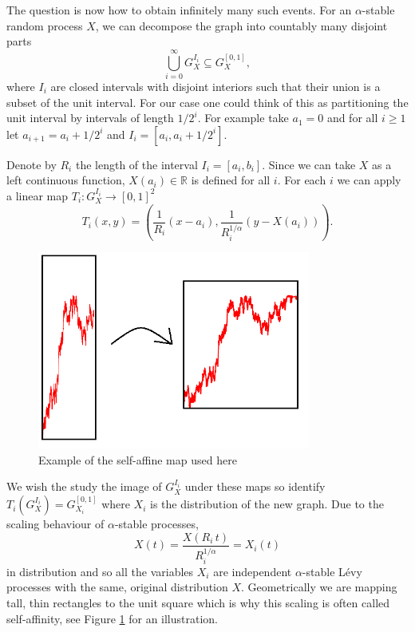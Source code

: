 The question is now how to obtain infinitely many such events. For an $\alpha$-stable random process $X$, we can decompose the graph into countably many disjoint parts
\[
\bigcup_{i=0}^\infty G_X^{I_i}\subseteq G_X^{[0,1]},
\]
where $I_i$ are closed intervals with disjoint interiors such that their union is a subset of the unit interval. For our case one could think of this as partitioning the unit interval by intervals of length $1/2^i$. For example take $a_1=0$ and for all $i\geq 1$ let $a_{i+1}=a_i+1/2^i$ and $I_i=[a_i,a_i+1/2^{i}].$

Denote by $R_i$ the length of the interval $I_i=[a_i,b_i]$. Since we can take $X$ as a left continuous function, $X(a_i)\in\mathbb{R}$ is defined for all $i$. For each $i$ we can apply a linear map $T_i: G_X^{I_i} \rightarrow [0,1]^2$
\[
T_i(x,y)=\left(\frac{1}{R_i}(x-a_i),\frac{1}{R_i^{1/\alpha}}\left(y-X(a_i)\right)\right).
\]

\begin{figure}[h]
    \centering
    \includegraphics[width=0.8\textwidth]{pics/ch-brownian/memes-map.png}
    \caption{Example of the self-affine map used here}
    \label{fig:rectangles-graph}
\end{figure}

We wish the study the image of $G_X^{I_i}$ under these maps so identify $T_i(G_X^{I_i})=G_{X_i}^{[0,1]}$ where $X_i$ is the distribution of the new graph. Due to the scaling behaviour of $\alpha$-stable processes, 
\[
X(t) = \frac{X(R_i\, t)}{R_i^{1/\alpha}} = X_i(t)
\]
in distribution and so all the variables $X_i$ are independent $\alpha$-stable L\'evy processes with the same, original distribution $X$. Geometrically we are mapping tall, thin rectangles to the unit square which is why this scaling is often called self-affinity, see Figure \ref{fig:rectangles-graph} for an illustration. 

